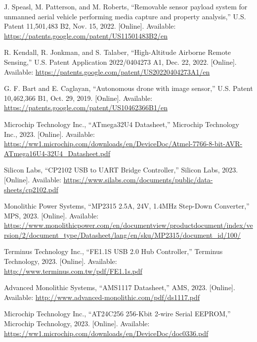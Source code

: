 \documentclass[12pt]{article}
\begin{document}
\begin{thebibliography}{99}
J. Speasl, M. Patterson, and M. Roberts, ``Removable sensor payload system for unmanned aerial vehicle performing media capture and property analysis,'' U.S. Patent 11,501,483 B2, Nov. 15, 2022. [Online]. Available: \url{https://patents.google.com/patent/US11501483B2/en}

R. Kendall, R. Jonkman, and S. Talaber, ``High-Altitude Airborne Remote Sensing,'' U.S. Patent Application 2022/0404273 A1, Dec. 22, 2022. [Online]. Available: \url{https://patents.google.com/patent/US20220404273A1/en}

G. F. Bart and E. Caglayan, ``Autonomous drone with image sensor,'' U.S. Patent 10,462,366 B1, Oct. 29, 2019. [Online]. Available: \url{https://patents.google.com/patent/US10462366B1/en}

Microchip Technology Inc., ``ATmega32U4 Datasheet,'' Microchip Technology Inc., 2023. [Online]. Available: \url{https://ww1.microchip.com/downloads/en/DeviceDoc/Atmel-7766-8-bit-AVR-ATmega16U4-32U4_Datasheet.pdf}

Silicon Labs, ``CP2102 USB to UART Bridge Controller,'' Silicon Labs, 2023. [Online]. Available: \url{https://www.silabs.com/documents/public/data-sheets/cp2102.pdf}

Monolithic Power Systems, ``MP2315 2.5A, 24V, 1.4MHz Step-Down Converter,'' MPS, 2023. [Online]. Available: \url{https://www.monolithicpower.com/en/documentview/productdocument/index/version/2/document_type/Datasheet/lang/en/sku/MP2315/document_id/100/}

Terminus Technology Inc., ``FE1.1S USB 2.0 Hub Controller,'' Terminus Technology, 2023. [Online]. Available: \url{http://www.terminus.com.tw/pdf/FE1.1s.pdf}

Advanced Monolithic Systems, ``AMS1117 Datasheet,'' AMS, 2023. [Online]. Available: \url{http://www.advanced-monolithic.com/pdf/ds1117.pdf}

Microchip Technology Inc., ``AT24C256 256-Kbit 2-wire Serial EEPROM,'' Microchip Technology, 2023. [Online]. Available: \url{https://ww1.microchip.com/downloads/en/DeviceDoc/doc0336.pdf}

\end{thebibliography}

\end{document}
